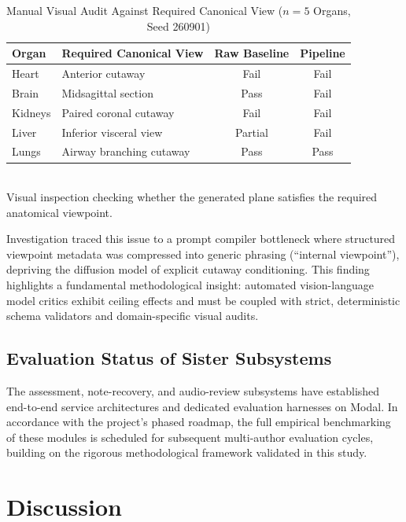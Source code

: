 \documentclass[conference]{IEEEtran}
\begin{document}
\begin{table}[t]
\caption{Manual Visual Audit Against Required Canonical View ($n=5$ Organs, Seed 260901)}
\label{tab:auditresults}
\centering
\begin{tabular}{p{1.2cm} p{2.4cm} c c}
\toprule
\textbf{Organ} & \textbf{Required Canonical View} & \textbf{Raw Baseline} & \textbf{Pipeline} \\
\midrule
Heart   & Anterior cutaway         & Fail    & Fail \\
Brain   & Midsagittal section       & Pass    & Fail \\
Kidneys & Paired coronal cutaway    & Fail    & Fail \\
Liver   & Inferior visceral view    & Partial & Fail \\
Lungs   & Airway branching cutaway  & Pass    & Pass \\
\bottomrule
\end{tabular}
\\[2pt]
\footnotesize Visual inspection checking whether the generated plane satisfies the required anatomical viewpoint.
\end{table}

Investigation traced this issue to a prompt compiler bottleneck where structured viewpoint metadata was compressed into generic phrasing (``internal viewpoint''), depriving the diffusion model of explicit cutaway conditioning. This finding highlights a fundamental methodological insight: automated vision-language model critics exhibit ceiling effects and must be coupled with strict, deterministic schema validators and domain-specific visual audits.

\subsection{Evaluation Status of Sister Subsystems}
\label{sec:sister_eval}

The assessment, note-recovery, and audio-review subsystems have established end-to-end service architectures and dedicated evaluation harnesses on Modal. In accordance with the project's phased roadmap, the full empirical benchmarking of these modules is scheduled for subsequent multi-author evaluation cycles, building on the rigorous methodological framework validated in this study.

\section{Discussion}
\label{sec:discussion}
\end{document}
